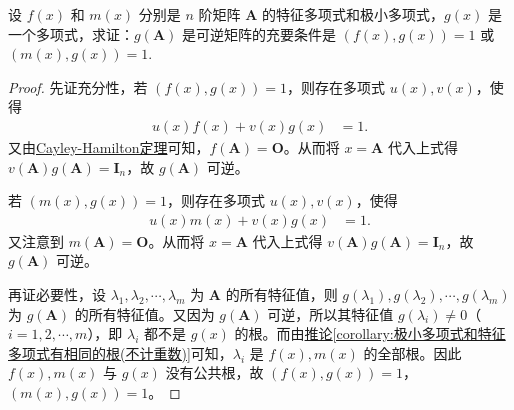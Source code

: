 \documentclass[../../main.tex]{subfiles}
\begin{document}
\begin{proposition}\label{proposition:g(A)可逆与A的特征多项式与极小多项式的关系}
设 \(f(x)\) 和 \(m(x)\) 分别是 \(n\) 阶矩阵 \(\boldsymbol{A}\) 的特征多项式和极小多项式，\(g(x)\) 是一个多项式，求证：\(g(\boldsymbol{A})\) 是可逆矩阵的充要条件是 \((f(x),g(x)) = 1\) 或 \((m(x),g(x)) = 1\).
\end{proposition}
\begin{proof}
先证充分性，若 \((f(x),g(x)) = 1\)，则存在多项式 \(u(x),v(x)\)，使得
\begin{align*}
u(x)f(x)+v(x)g(x)&=1.
\end{align*}
又由\hyperref[theorem:Cayley-Hamilton定理]{Cayley-Hamilton定理}可知，\(f(\boldsymbol{A})=\boldsymbol{O}\)。从而将 \(x = \boldsymbol{A}\) 代入上式得 \(v(\boldsymbol{A})g(\boldsymbol{A})=\boldsymbol{I}_n\)，故 \(g(\boldsymbol{A})\) 可逆。

若 \((m(x),g(x)) = 1\)，则存在多项式 \(u(x),v(x)\)，使得
\begin{align*}
u(x)m(x)+v(x)g(x)&=1.
\end{align*}
又注意到 \(m(\boldsymbol{A})=\boldsymbol{O}\)。从而将 \(x = \boldsymbol{A}\) 代入上式得 \(v(\boldsymbol{A})g(\boldsymbol{A})=\boldsymbol{I}_n\)，故 \(g(\boldsymbol{A})\) 可逆。

再证必要性，设 \(\lambda_1,\lambda_2,\cdots,\lambda_m\) 为 \(\boldsymbol{A}\) 的所有特征值，则 \(g(\lambda_1),g(\lambda_2),\cdots,g(\lambda_m)\) 为 \(g(\boldsymbol{A})\) 的所有特征值。又因为 \(g(\boldsymbol{A})\) 可逆，所以其特征值 \(g(\lambda_i)\neq 0\)（\(i = 1,2,\cdots,m\)），即 \(\lambda_i\) 都不是 \(g(x)\) 的根。而由\hyperref[corollary:极小多项式和特征多项式有相同的根(不计重数)]{推论\ref{corollary:极小多项式和特征多项式有相同的根(不计重数)}}可知，\(\lambda_i\) 是 \(f(x),m(x)\) 的全部根。因此 \(f(x),m(x)\) 与 \(g(x)\) 没有公共根，故 \((f(x),g(x)) = 1\)，\((m(x),g(x)) = 1\)。 
\end{proof}
\end{document}
